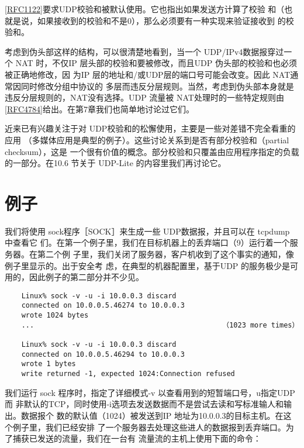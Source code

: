\begin{tcolorbox}
  \href{https://www.rfc-editor.org/rfc/rfc1122}{[RFC1122]}要求UDP校验和被默认使用。它也指出如果发送方计算了校验
  和（也就是说，如果接收到的校验和不是0），那么必须要有一种实现来验证接收到
  的校验和。
\end{tcolorbox}

考虑到伪头部这样的结构，可以很清楚地看到，当一个 UDP/IPv4数据报穿过一个 NAT
时，不仅IP 层头部的校验和要被修改，而且UDP 伪头部的校验和也必须被正确地修改，因
为IP 层的地址和/或UDP层的端口号可能会改变。因此 NAT通常因同时修改分组中协议的
多层而违反分层规则。当然，考虑到伪头部本身就是违反分层规则的，NAT没有选择。UDP
流量被
NAT处理时的一些特定规则由\href{https://www.rfc-editor.org/rfc/rfc4784}{[RFC4784]}给出。在第7章我们也简单地讨论过它们。

近来已有兴趣关注于对 UDP校验和的松懈使用，主要是一些对差错不完全看重的应用
（多媒体应用是典型的例子）。这些讨论关系到是否有部分校验和（partial checksum），这是
一个很有价值的概念。部分校验和只覆盖由应用程序指定的负载的一部分。在10.6 节关于
UDP-Lite 的内容里我们再讨论它。

\section{例子}
我们将使用 sock程序［SOCK］来生成一些 UDP数据报，并且可以在 tcpdump 中查看它
们。在第一个例子里，我们在目标机器上的丢弃端口（9）运行着一个服务器。在第二个例
子里，我们关闭了服务器，客户机收到了这个事实的通知，像例子里显示的。出于安全考
虑，在典型的机器配置里，基于UDP 的服务极少是可用的，因此例子的第二部分并不少见。

\begin{verbatim}
    Linux% sock -v -u -i 10.0.0.3 discard
    connected on 10.0.0.5.46274 to 10.0.0.3
    wrote 1024 bytes
    ...                                             （1023 more times）

    Linux% sock -v -u -i 10.0.0.3 discard
    connected on 10.0.0.5.46294 to 10.0.0.3
    wrote 1 bytes
    write returned -1, expected 1024:Connection refused
\end{verbatim}

我们运行 sock 程序时，指定了详细模式-v 以查看用到的短暂端口号，u指定UDP而
非默认的TCP，同时使用-i选项去发送数据而不是尝试去读和写标准输人和输出。数据报个
数的默认值（1024）被发送到IP 地址为10.0.0.3的目标主机。在这个例子里，我们已经安排
了一个服务器去处理这些进人的数据报到丢弃端口。为了捕获已发送的流量，我们在一台有
流量流的主机上使用下面的命令：

